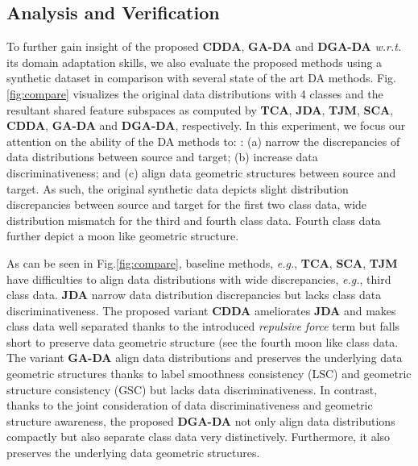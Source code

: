 \documentclass[journal,twocolumn]{IEEEtran}
\begin{document}
\begin{CJK*}{UTF8}{gkai}




\subsection{Analysis and Verification}
\label{subsection:Analysis and Verification}



To further gain insight of the proposed \textbf{CDDA}, \textbf{GA-DA} and \textbf{DGA-DA} \textit{w.r.t.} its domain adaptation skills, we also evaluate the proposed methods using a synthetic dataset in comparison with several state of the art DA methods. Fig.\ref{fig:compare} visualizes the original data distributions with 4 classes and the resultant shared feature subspaces as computed by \textbf{TCA}, \textbf{JDA}, \textbf{TJM}, \textbf{SCA}, \textbf{CDDA}, \textbf{GA-DA} and \textbf{DGA-DA}, respectively. In this experiment, we focus our attention on the ability of the DA methods to: :  (a) narrow the discrepancies of data distributions between source and target; (b) increase data discriminativeness; and (c) align data geometric structures between source and target. As such, the original synthetic data depicts slight distribution discrepancies between source and target for the first two class data, wide distribution mismatch for the third and fourth class data. Fourth class data further depict a moon like geometric structure. 




As can be seen in Fig.\ref{fig:compare}, baseline methods, \textit{e.g.}, \textbf{TCA}, \textbf{SCA}, \textbf{TJM} have difficulties to align data distributions with wide discrepancies, \textit{e.g.}, third class data. \textbf{JDA} narrow data distribution discrepancies but lacks class data discriminativeness. The proposed variant \textbf{CDDA} ameliorates \textbf{JDA} and makes class data well separated thanks to the introduced \textit{repulsive force} term but falls short to preserve data geometric structure (see the fourth  moon like class data. The variant \textbf{GA-DA} align data distributions and preserves the underlying data geometric structures thanks to label smoothness consistency (LSC) and geometric structure consistency (GSC) but lacks data discriminativeness. In contrast, thanks to the joint consideration of data discriminativeness and geometric structure awareness, the proposed \textbf{DGA-DA} not only align data distributions compactly but also separate class data very distinctively. Furthermore, it also preserves the underlying data geometric structures.   


\end{CJK*}
\end{document}
